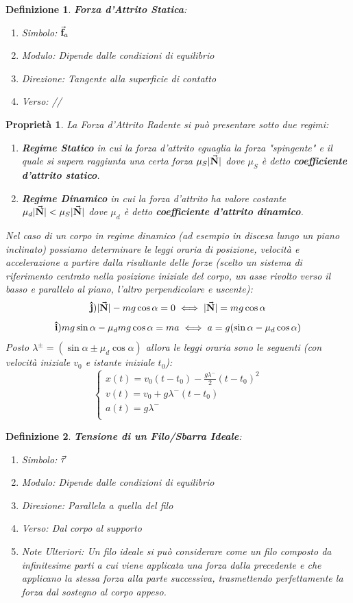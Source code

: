 \documentclass{article}
\newtheorem{property}{Proprietà}[section]
\newtheorem{defn}{Definizione}[section]
\renewcommand{\i}{\vu{i}}
\renewcommand{\j}{\vu{j}}
\newcommand{\N}{\va{N}}
\begin{document}
\begin{defn}
\textbf{Forza d'Attrito Statica}:
\begin{enumerate}
    \item Simbolo: $\va{f}_a$
    \item Modulo: Dipende dalle condizioni di equilibrio
    \item Direzione: Tangente alla superficie di contatto
    \item Verso: //
\end{enumerate}
\end{defn}
\begin{property}
La Forza d'Attrito Radente si può presentare sotto due regimi:
\begin{enumerate}
    \item \textbf{Regime Statico} in cui la forza d'attrito eguaglia la forza "spingente" e il quale si supera raggiunta una certa forza $\mu_S|\N|$ dove $\mu_S$ è detto \textbf{coefficiente d'attrito statico}.
    \item \textbf{Regime Dinamico} in cui la forza d'attrito ha valore costante $\mu_d|\N|<\mu_S|\N|$ dove $\mu_d$ è detto \textbf{coefficiente d'attrito dinamico}.
\end{enumerate}
Nel caso di un corpo in regime dinamico (ad esempio in discesa lungo un piano inclinato) possiamo determinare le leggi oraria di posizione, velocità e accelerazione a partire dalla risultante delle forze (scelto un sistema di riferimento centrato nella posizione iniziale del corpo, un asse rivolto verso il basso e parallelo al piano, l'altro perpendicolare e uscente):
\[\j) |\N|-mg\cos\alpha=0\iff |\N|=mg\cos\alpha\]
\[\i) mg\sin\alpha-\mu_dmg\cos\alpha=ma\iff a=g(\sin\alpha-\mu_d\cos\alpha)\]
Posto $\lambda^\pm=(\sin\alpha\pm\mu_d\cos\alpha)$ allora le leggi oraria sono le seguenti (con velocità iniziale $v_0$ e istante iniziale $t_0$):
\[\left\{\begin{array}{l}
    x(t)=v_0(t-t_0)-\frac{g\lambda^-}{2}(t-t_0)^2   \\
    v(t)=v_0+g\lambda^-(t-t_0)    \\
    a(t)=g\lambda^-   \\
\end{array}\right.\]
\end{property}



\begin{defn}
\textbf{Tensione di un Filo/Sbarra Ideale}:
\begin{enumerate}
    \item Simbolo: $\va{\tau}$
    \item Modulo: Dipende dalle condizioni di equilibrio
    \item Direzione: Parallela a quella del filo
    \item Verso: Dal corpo al supporto
    \item Note Ulteriori: Un filo ideale si può considerare come un filo composto da infinitesime parti a cui viene applicata una forza dalla precedente e che applicano la stessa forza alla parte successiva, trasmettendo perfettamente la forza dal sostegno al corpo appeso.
\end{enumerate}
\end{defn}
\end{document}
